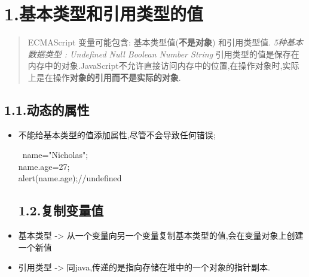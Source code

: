 \documentclass{article}
\begin{document}
\mdxtitleblockstart{}
\mdxauthorstart{}
\mdxauthorend\mdtitleauthorrunning{}{}\mdxtitleblockend%

\section{1.\hspace*{0.5em}基本类型和引用类型的值}\label{section}%

\begin{quote}%

\noindent ECMAScript 变量可能包含: 基本类型值(\textbf{不是对象}) 和引用类型值.
\emph{ 5种基本数据类型 : Undefined Null Boolean Number String
} 引用类型的值是保存在内存中的对象.JavaScript不允许直接访问内存中的位置,在操作对象时,实际上是在操作\textbf{对象的引用而不是实际的对象}.%
\end{quote}%

\subsection{1.1.\hspace*{0.5em}动态的属性}\label{section}%

\begin{itemize}%

\item{}
不能给基本类型的值添加属性,尽管不会导致任何错误;%
\begin{mdpre}%
~name={"}{Nicholas}{"};\\
name.age={27};\\
alert(name.age);{//undefined}%
\end{mdpre}
\subsection{1.2.\hspace*{0.5em}复制变量值}\label{section}%

\item{}
基本类型 -\textgreater{} 从一个变量向另一个变量复制基本类型的值,会在变量对象上创建一个新值%

\item{}
引用类型 -\textgreater{} 同java,传递的是指向存储在堆中的一个对象的指针副本.%
\end{itemize}%
\end{document}
